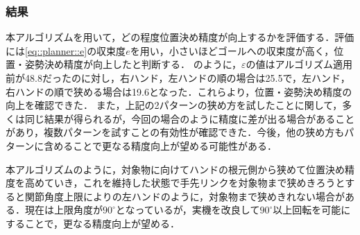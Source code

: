 \documentclass[a4paper,twoside,12pt,papersize, dvipdfmx]{iirthesis}
\begin{document}
\subsubsection{結果}
本アルゴリズムを用いて，どの程度位置決め精度が向上するかを評価する．評価には\eqref{eq::planner::e}の収束度$e$を用い，小さいほどゴールへの収束度が高く，位置・姿勢決め精度が向上したと判断する．
のように，$\varepsilon$の値はアルゴリズム適用前が48.8だったのに対し，右ハンド，左ハンドの順の場合は25.5で，左ハンド，右ハンドの順で狭める場合は19.6となった．これらより，位置・姿勢決め精度の向上を確認できた．
また，上記の2パターンの狭め方を試したことに関して，多くは同じ結果が得られるが，今回の場合のように精度に差が出る場合があることがあり，複数パターンを試すことの有効性が確認できた．今後，他の狭め方もパターンに含めることで更なる精度向上が望める可能性がある．　\par
本アルゴリズムのように，対象物に向けてハンドの根元側から狭めて位置決め精度を高めていき，これを維持した状態で手先リンクを対象物まで狭めきろうとすると関節角度上限によりの左ハンドのように，対象物まで狭めきれない場合がある．現在は上限角度が$90^{\circ}$となっているが，実機を改良して$90^{\circ}$以上回転を可能にすることで，更なる精度向上が望める．
\end{document}
